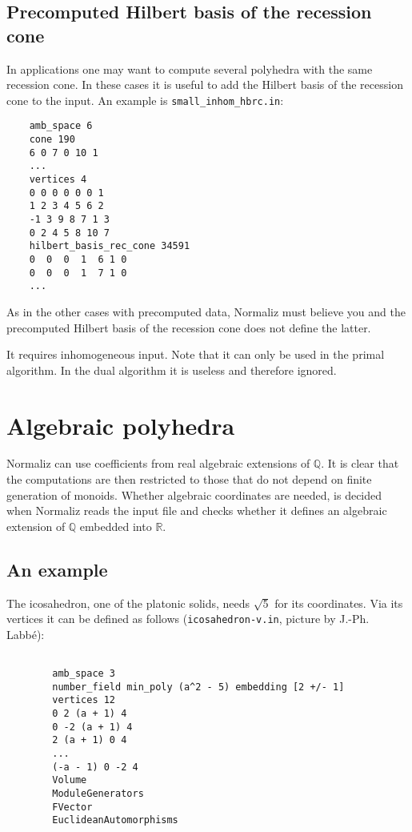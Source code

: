 \documentclass[12pt,a4paper]{scrartcl}
\theoremstyle{definition}
\def\QQ{{\mathbb Q}}
\def\RR{{\mathbb R}}
\begin{document}
{	
	\subsection{Precomputed Hilbert basis of the recession cone}\label{HB_rec_cone}
	
	In applications one may want to compute several polyhedra with the same recession cone. In these cases it is useful to add the Hilbert basis of the recession cone to the input. An example is \verb|small_inhom_hbrc.in|:
	\begin{Verbatim}
	amb_space 6
	cone 190
	6 0 7 0 10 1
	...
	vertices 4
	0 0 0 0 0 0 1
	1 2 3 4 5 6 2
	-1 3 9 8 7 1 3
	0 2 4 5 8 10 7
	hilbert_basis_rec_cone 34591
	0  0  0  1  6 1 0
	0  0  0  1  7 1 0
	...
	\end{Verbatim}
	As in the other cases with precomputed data, Normaliz must believe you and the precomputed Hilbert basis of the recession cone does not define the latter.
	
	It requires inhomogeneous input. Note that it can only be used in the primal algorithm. In the dual algorithm it is useless and therefore ignored.  
	
	
	\section{Algebraic polyhedra} \label{Algebraic}
	
	Normaliz can use coefficients from real algebraic extensions of $\QQ$. It is clear that the computations are then restricted to those that do not depend on finite generation of monoids.  Whether algebraic coordinates are needed, is decided when Normaliz reads the input file and checks whether it defines an algebraic extension of $\QQ$ embedded into $\RR$.
	
	\subsection{An example}\label{alg_ex}
	
	The icosahedron, one of the platonic solids, needs $\sqrt 5$ for its coordinates. Via its vertices it can be defined as follows (\verb|icosahedron-v.in|, picture by J.-Ph. Labbé):
	
	\begin{minipage}[b]{0.5\textwidth}
		\begin{verbatim}
		
		amb_space 3
		number_field min_poly (a^2 - 5) embedding [2 +/- 1]
		vertices 12
		0 2 (a + 1) 4
		0 -2 (a + 1) 4
		2 (a + 1) 0 4
		...
		(-a - 1) 0 -2 4
		Volume
		ModuleGenerators
		FVector
		EuclideanAutomorphisms
		

\end{verbatim}
\end{minipage}}
\end{document}
